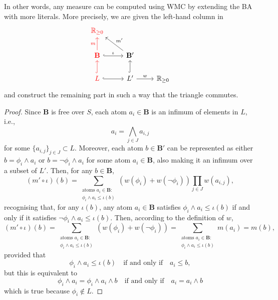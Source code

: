 \documentclass{article}
\theoremstyle{definition}
\theoremstyle{remark}
\begin{document}
In other words, any measure can be computed using WMC by extending the BA with
more literals. More precisely, we are given the left-hand column in
\[
  \begin{tikzcd}
    \textcolor{red}{\mathbb{R}_{\ge 0}} & & \\
    \textcolor{red}{\mathbf{B}} \arrow[red]{u}{m} \ar[r,hookrightarrow,"\iota"]
    & \mathbf{B'} \arrow{lu}[swap]{m'} & \\
    \textcolor{red}{L} \ar[u,red,hookrightarrow] \ar[r,hookrightarrow] & L'
    \ar[u,hookrightarrow] \arrow{r}{w} & \mathbb{R}_{\ge 0}
  \end{tikzcd}
\]
and construct the remaining part in such a way that the triangle commutes.

\begin{proof}
  Since $\mathbf{B}$ is free over $S$, each atom $a_i \in \mathbf{B}$ is an
  infimum of elements in $L$, i.e.,
  \[
    a_i = \bigwedge_{j \in J} a_{i,j}
  \]
  for some $\{ a_{i,j} \}_{j \in J} \subset L$. Moreover, each atom $b \in
  \mathbf{B'}$ can be represented as either $b = \phi_i \land a_i$ or $b =
  \neg\phi_i \land a_i$ for some atom $a_i \in \mathbf{B}$, also making it an
  infimum over a subset of $L'$. Then, for any $b \in \mathbf{B}$,
  \[
    (m' \circ \iota)(b) = \sum_{\substack{\text{atoms } a_i \in \mathbf{B}:\\
        \phi_i \land a_i \le \iota(b)}} (w(\phi_i) + w(\neg\phi_i)) \prod_{j \in
    J} w(a_{i,j}),
  \]
  recognising that, for any $\iota(b)$, any atom $a_i \in \mathbf{B}$ satisfies
  $\phi_i \land a_i \le \iota(b)$ if and only if it satisfies $\neg\phi_i \land
  a_i \le \iota(b)$. Then, according to the definition of $w$,
  \[
    (m' \circ \iota)(b) = \sum_{\substack{\text{atoms } a_i \in \mathbf{B}:\\
        \phi_i \land a_i \le \iota(b)}} (w(\phi_i) + w(\neg\phi_i)) =
    \sum_{\substack{\text{atoms } a_i \in \mathbf{B}:\\ \phi_i \land a_i \le
        \iota(b)}} m(a_i) = m(b),
  \]
  provided that
  \[
    \phi_i \land a_i \le \iota(b) \quad \text{if and only if} \quad a_i \le b,
  \]
  but this is equivalent to
  \[
    \phi_i \land a_i = \phi_i \land a_i \land b \quad \text{if and only if}
    \quad a_i = a_i \land b
  \]
  which is true because $\phi_i \not\in L$.
\end{proof}
\end{document}
